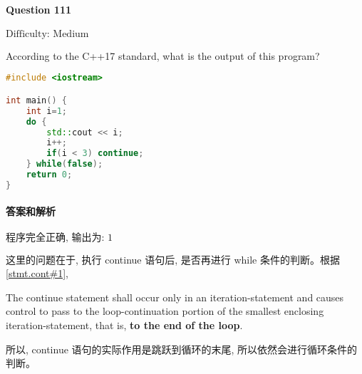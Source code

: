 \documentclass{article}
\begin{document}
	\paragraph*{Question 111} $\boxed{\text{Difficulty: Medium}} $			
	
	According to the C++17 standard, what is the output of this program?
	
	\begin{lstlisting}[language=C++]  		
#include <iostream>

int main() {
	int i=1;
	do {
		std::cout << i;
		i++;
		if(i < 3) continue;
	} while(false);
	return 0;
}
	\end{lstlisting}
	
	
	\paragraph*{答案和解析} $\boxed{\text{程序完全正确, 输出为: 1}} $
	
	这里的问题在于, 执行 continue 语句后, 是否再进行 while 条件的判断。根据\href{https://timsong-cpp.github.io/cppwp/n4659/stmt.cont#1}{[stmt.cont\#1]},
	\begin{lightgrayleftbar}
		The continue statement shall occur only in an iteration-statement and causes control to pass to the loop-continuation portion of the smallest enclosing iteration-statement, that is, \textbf{to the end of the loop}.
	\end{lightgrayleftbar}
	
	所以, continue 语句的实际作用是跳跃到循环的末尾, 所以依然会进行循环条件的判断。
	
\end{document}
